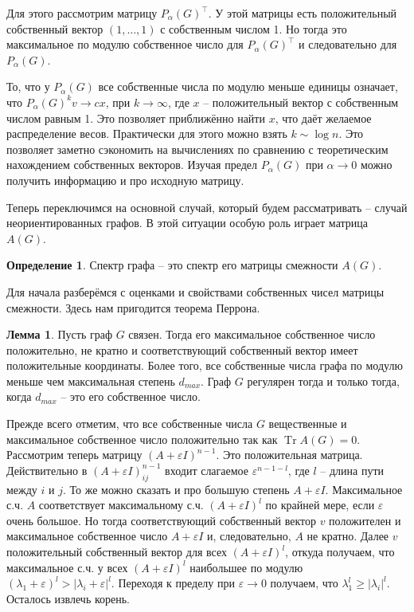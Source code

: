 \documentclass[10pt,a4paper,oneside]{book}
\theoremstyle{definition}
\newtheorem*{defn}{{\color{yellow!30!red} Определение}}
\newtheorem{lem}{{\color{green!50!black} Лемма}}
\newcommand{\Tr}{\operatorname{Tr}}
\def\eps{\varepsilon}
\def\dfn{\begin{defn}}
\def\edfn{\end{defn}}
\def\lm{\begin{lem}}
\def\elm{\end{lem}}
\begin{document}
Для этого рассмотрим матрицу $P_{\alpha}(G)^{\top}$. У этой матрицы есть положительный собственный вектор $(1,\dots,1)$ с собственным числом 1. Но тогда это максимальное по модулю собственное число для $P_{\alpha}(G)^{\top}$ и следовательно для $P_{\alpha}(G)$. 

То, что у $P_{\alpha}(G)$ все собственные числа по модулю меньше единицы означает, что $P_{\alpha}(G)^kv \to cx$, при $k \to \infty$, где $x$ -- положительный вектор с собственным числом равным 1. Это позволяет приближённо найти $x$, что даёт желаемое распределение весов. Практически для этого можно взять $k\sim \log n$. Это позволяет заметно сэкономить на вычислениях по сравнению с теоретическим нахождением собственных векторов. Изучая предел $P_{\alpha}(G)$ при $\alpha \to 0$ можно получить информацию и про исходную матрицу.


Теперь переключимся на основной случай, который будем рассматривать -- случай неориентированных графов. В этой ситуации особую роль играет матрица $A(G)$.


\dfn Спектр графа -- это спектр его матрицы смежности $A(G)$.
\edfn


Для начала разберёмся с оценками и свойствами собственных чисел матрицы смежности. Здесь нам пригодится теорема Перрона. 


\lm Пусть граф $G$ связен. Тогда его максимальное собственное число положительно, не кратно и соответствующий собственный вектор имеет положительные координаты. Более того, все собственные числа графа по модулю меньше чем максимальная степень $d_{max}$. Граф $G$ регулярен тогда и только тогда, когда $d_{max}$ -- это его собственное число.
\elm
\proof Прежде всего отметим, что все собственные числа $G$ вещественные и максимальное собственное число положительно так как $\Tr A(G)=0$. Рассмотрим теперь матрицу $(A+\eps I)^{n-1}$. Это положительная матрица. Действительно в $(A+\eps I)^{n-1}_{ij}$ входит слагаемое $\eps^{n-1-l}$, где $l$ -- длина пути между $i$ и $j$. То же можно сказать и про большую степень $A+\eps I$. Максимальное с.ч. $A$ соответствует максимальному с.ч. $(A+\eps I)^l$ по крайней мере, если $\eps$ очень большое. Но тогда соответствующий собственный вектор $v$ положителен и максимальное собственное число $A+\eps I$ и, следовательно, $A$ не кратно. Далее $v$ положительный собственный вектор для всех $(A+\eps I)^{l}$, откуда получаем, что максимальное с.ч. у всех $(A+\eps I)^{l}$ наибольшее по модулю $(\lambda_1+\eps)^l>|\lambda_i+\eps|^l$. Переходя к пределу при $\eps \to 0$ получаем, что $\lambda_1^l \geq |\lambda_i|^l$. Осталось извлечь корень.
\end{document}
